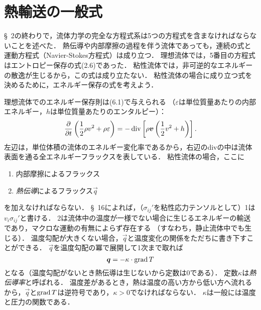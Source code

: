 \section{熱輸送の一般式}

\S~2の終わりで，流体力学の完全な方程式系は5つの方程式を含まなければならないことを述べた．
熱伝導や内部摩擦の過程を伴う流体であっても，連続の式と運動方程式（Navier-Stokes方程式）は成り立つ．
理想流体では，5番目の方程式はエントロピー保存の式(2.6)であった．
粘性流体では，非可逆的なエネルギーの散逸が生じるから，この式は成り立たない．
粘性流体の場合に成り立つ式を決めるために，エネルギー保存の式を考えよう．


理想流体でのエネルギー保存則は(6.1)で与えられる
（$\varepsilon$は単位質量あたりの内部エネルギー，$h$は単位質量あたりのエンタルピー）：
\[
    \pdv{t} \left( \frac{1}{2}\rho v^2 + \rho\varepsilon \right)
    = -\operatorname{div} \left[ \rho \vb*{v} \left( \frac{1}{2}v^2 + h \right) \right] .
\]
左辺は，単位体積の流体のエネルギー変化率であるから，右辺のdivの中は流体表面を通る全エネルギーフラックスを表している．
粘性流体の場合，ここに
\begin{enumerate}
    \item 内部摩擦によるフラックス
    \item \emph{熱伝導}によるフラックス$\vec{q}$
\end{enumerate}
を加えなければならない．
\S~16によれば，（$\sigma_{ij}'$を粘性応力テンソルとして）1は$v_i\sigma_{ij}'$と書ける．
2は流体中の温度が一様でない場合に生じるエネルギーの輸送であり，マクロな運動の有無によらず存在する
（すなわち，静止流体中でも生じる）．
温度勾配が大きくない場合，$\vec{q}$と温度変化の関係をただちに書き下すことができる．
$\vec{q}$を温度勾配の冪で展開して1次まで取れば
\begin{equation}\label{eq49.1:Fourierの法則}
    \vb*{q} = -\kappa \cdot \operatorname{grad} T
\end{equation}
となる（温度勾配がないとき熱伝導は生じないから定数は0である）．
定数$\kappa$は\emph{熱伝導率}と呼ばれる．
温度差があるとき，熱は温度の高い方から低い方へ流れるから，$\vec{q}$と$\operatorname{grad} T$は逆符号であり，$\kappa>0$でなければならない．
$\kappa$は一般には温度と圧力の関数である．

